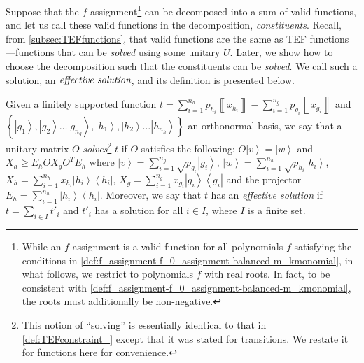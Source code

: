 \documentclass{theoretics}
\newcommand{\atul}[1]{#1} %
\begin{document}
Suppose that the $f$-assignment\footnote{While an $f$-assignment is a valid function for all polynomials
  $f$ satisfying the conditions in \cref{def:f_assignment-f_0_assignment-balanced-m_kmonomial},
  in what follows, we restrict to polynomials $f$
  with real roots. In fact,  to be consistent with \cref{def:f_assignment-f_0_assignment-balanced-m_kmonomial}, the roots
  must additionally be non-negative.} can be decomposed into a sum of valid functions, and let us call these valid functions in
the decomposition, \emph{constituents}.  Recall, from \cref{subsec:TEFfunctions}, that valid functions are the same as TEF functions---functions that can be \emph{solved} using some unitary $U$. Later, we show how to choose the decomposition such that the constituents can be \emph{solved}. We call such a solution, an $\emph{effective solution}$, and its definition is presented below.
%
\begin{definition}
  Given a finitely supported function $t=\sum_{i=1}^{n_{h}}p_{h_{i}}\left\llbracket x_{h_{i}}\right\rrbracket -\sum_{i=1}^{n_{g}}p_{g_{i}}\left\llbracket x_{g_{i}}\right\rrbracket $
  and $\left\{ \left|g_{1}\right\rangle ,\left|g_{2}\right\rangle \dots\left|g_{n_{g}}\right\rangle ,\left|h_{1}\right\rangle ,\left|h_{2}\right\rangle \dots\left|h_{n_{h}}\right\rangle \right\} $ an orthonormal basis,
  we say that a unitary matrix $O$ \emph{solves}\footnote{\atul{This notion of ``solving'' is essentially identical to that in \cref{def:TEFconstraint_} except that it was stated for transitions. We restate it for functions here for convenience.}} $t$ if $O$ satisfies
  the following: $O\left|v\right\rangle =\left|w\right\rangle $ and
  $X_{h}\ge E_{h}OX_{g}O^{T}E_{h}$ where $\left|v\right\rangle =\sum_{i=1}^{n_{g}}\sqrt{p_{g_{i}}}\left|g_{i}\right\rangle $,
  $\left|w\right\rangle =\sum_{i=1}^{n_{h}}\sqrt{p_{h_{i}}}\left|h_{i}\right\rangle $,
  $X_{h}=\sum_{i=1}^{n_{h}}x_{h_{i}}\left|h_{i}\right\rangle \left\langle h_{i}\right|$,
  $X_{g}=\sum_{i=1}^{n_{g}}x_{g_{i}}\left|g_{i}\right\rangle \left\langle g_{i}\right|$
  and the projector $E_{h}=\sum_{i=1}^{n_{h}}\left|h_{i}\right\rangle \left\langle h_{i}\right|$. Moreover, we say that $t$ has an \emph{effective solution} if $t=\sum_{i\in I}t'_i$ and $t'_i$ has a solution for all $i\in I$, where $I$ is a finite set.
  \label{def:solvingassignment}
\end{definition}
\end{document}
